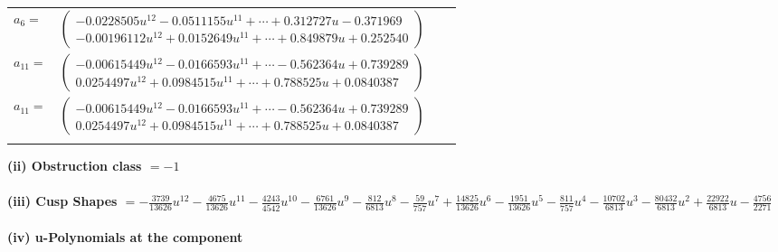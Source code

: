 \documentclass[1p]{elsarticle_modified}
\theoremstyle{definition}
\begin{document}
\begin{tabular}{m{7pt} m{180pt} m{7pt} m{180pt} }
\flushright $a_{6}=$&$\begin{pmatrix}-0.0228505 u^{12}-0.0511155 u^{11}+\cdots+0.312727 u-0.371969\\-0.00196112 u^{12}+0.0152649 u^{11}+\cdots+0.849879 u+0.252540\end{pmatrix}$ \\
\flushright $a_{11}=$&$\begin{pmatrix}-0.00615449 u^{12}-0.0166593 u^{11}+\cdots-0.562364 u+0.739289\\0.0254497 u^{12}+0.0984515 u^{11}+\cdots+0.788525 u+0.0840387\end{pmatrix}$\\ \flushright $a_{11}=$&$\begin{pmatrix}-0.00615449 u^{12}-0.0166593 u^{11}+\cdots-0.562364 u+0.739289\\0.0254497 u^{12}+0.0984515 u^{11}+\cdots+0.788525 u+0.0840387\end{pmatrix}$\\&\end{tabular}
\flushleft \textbf{(ii) Obstruction class $= -1$}\\~\\
\flushleft \textbf{(iii) Cusp Shapes $= -\frac{3739}{13626} u^{12}-\frac{4675}{13626} u^{11}-\frac{4243}{4542} u^{10}-\frac{6761}{13626} u^9-\frac{812}{6813} u^8-\frac{59}{757} u^7+\frac{14825}{13626} u^6-\frac{1951}{13626} u^5-\frac{811}{757} u^4-\frac{10702}{6813} u^3-\frac{80432}{6813} u^2+\frac{22922}{6813} u-\frac{4756}{2271}$}\\~\\
\newpage\renewcommand{\arraystretch}{1}
\flushleft \textbf{(iv) u-Polynomials at the component}\newline \\
\end{document}
